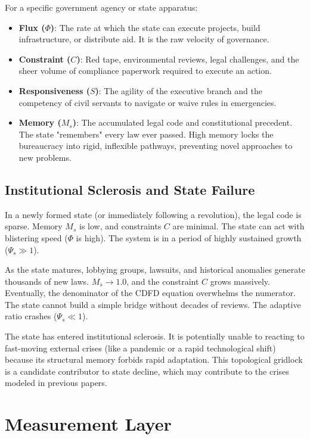 \documentclass[11pt,a4paper]{article}
\begin{document}
For a specific government agency or state apparatus:
\begin{itemize}
    \item \textbf{Flux ($\Phi$)}: The rate at which the state can execute projects, build infrastructure, or distribute aid. It is the raw velocity of governance.
    \item \textbf{Constraint ($C$)}: Red tape, environmental reviews, legal challenges, and the sheer volume of compliance paperwork required to execute an action.
    \item \textbf{Responsiveness ($S$)}: The agility of the executive branch and the competency of civil servants to navigate or waive rules in emergencies.
    \item \textbf{Memory ($M_s$)}: The accumulated legal code and constitutional precedent. The state "remembers" every law ever passed. High memory locks the bureaucracy into rigid, inflexible pathways, preventing novel approaches to new problems.
\end{itemize}

\subsection{Institutional Sclerosis and State Failure}
In a newly formed state (or immediately following a revolution), the legal code is sparse. Memory $M_s$ is low, and constraints $C$ are minimal. The state can act with blistering speed ($\Phi$ is high). The system is in a period of highly sustained growth ($\Psi_s \gg 1$).

As the state matures, lobbying groups, lawsuits, and historical anomalies generate thousands of new laws. $M_s \to 1.0$, and the constraint $C$ grows massively. Eventually, the denominator of the CDFD equation overwhelms the numerator. The state cannot build a simple bridge without decades of reviews. The adaptive ratio crashes ($\Psi_s \ll 1$).

The state has entered institutional sclerosis. It is potentially unable to reacting to fast-moving external crises (like a pandemic or a rapid technological shift) because its structural memory forbids rapid adaptation. This topological gridlock is a candidate contributor to state decline, which may contribute to the crises modeled in previous papers.



\section{Measurement Layer}
\end{document}
